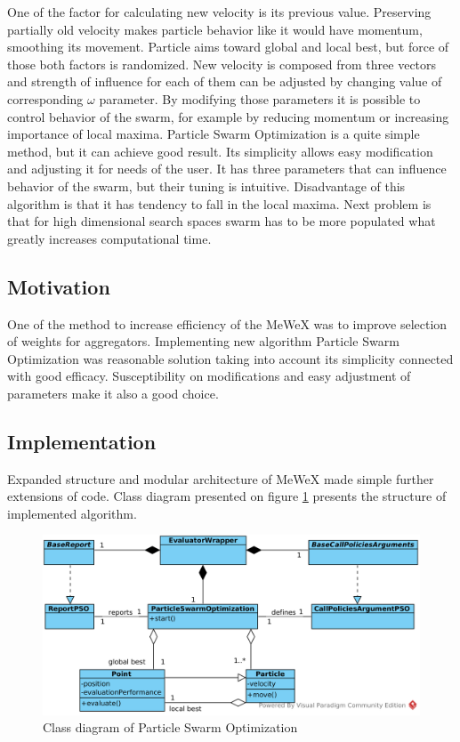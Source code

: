 One of the factor for calculating new velocity is its previous value. Preserving partially old velocity makes particle behavior 
like it would have momentum, smoothing its movement. Particle aims toward global and local best, but force of those both factors is randomized.
New velocity is composed from three vectors and strength of influence for each of them can be adjusted by changing value 
of corresponding \(\omega\) parameter. By modifying those parameters it is possible to control behavior of the swarm, for example 
by reducing momentum or increasing importance of local maxima.
\clearpage
Particle Swarm Optimization is a quite simple method, but it can achieve good result. Its simplicity allows easy modification and adjusting 
it for needs of the user. It has three parameters that can influence behavior of the swarm, but their tuning is intuitive. 
Disadvantage of this algorithm is that it has tendency to fall in the local maxima. Next problem is that for high dimensional search spaces 
swarm has to be more populated what greatly increases computational time. 

\subsection{Motivation}
One of the method to increase efficiency of the MeWeX was to improve selection of weights for aggregators. 
Implementing new algorithm Particle Swarm Optimization was reasonable solution taking into account its simplicity 
connected with good efficacy. Susceptibility on modifications and easy adjustment of parameters make it also a good choice.

\subsection{Implementation}
Expanded structure and modular architecture of MeWeX made simple further extensions of code. Class diagram presented on figure \ref{img_pso_class}
presents the structure of implemented algorithm.
\begin{figure}[ht]
\centering
    \includegraphics[scale=0.2]{img/pso_class.png}
    \caption{Class diagram of Particle Swarm Optimization}
    \label{img_pso_class}
\end{figure}


